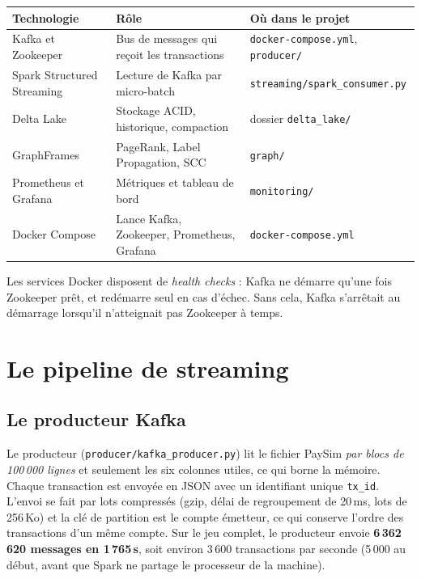 \documentclass[11pt,a4paper]{article}
\begin{document}
\begin{center}
\small
\begin{tabular}{@{}p{3.2cm}p{5.4cm}p{5.2cm}@{}}
\toprule
\textbf{Technologie} & \textbf{R\^ole} & \textbf{O\`u dans le projet} \\
\midrule
Kafka et Zookeeper & Bus de messages qui re\c{c}oit les transactions & \texttt{docker-compose.yml}, \texttt{producer/} \\
Spark Structured Streaming & Lecture de Kafka par micro-batch & \texttt{streaming/spark\_consumer.py} \\
Delta Lake & Stockage ACID, historique, compaction & dossier \texttt{delta\_lake/} \\
GraphFrames & PageRank, Label Propagation, SCC & \texttt{graph/} \\
Prometheus et Grafana & M\'etriques et tableau de bord & \texttt{monitoring/} \\
Docker Compose & Lance Kafka, Zookeeper, Prometheus, Grafana & \texttt{docker-compose.yml} \\
\bottomrule
\end{tabular}
\end{center}

Les services Docker disposent de \emph{health checks} : Kafka ne d\'emarre qu'une fois Zookeeper pr\^et, et red\'emarre seul en cas d'\'echec. Sans cela, Kafka s'arr\^etait au d\'emarrage lorsqu'il n'atteignait pas Zookeeper \`a temps.

\section{Le pipeline de streaming}
\subsection{Le producteur Kafka}
Le producteur (\texttt{producer/kafka\_producer.py}) lit le fichier PaySim \emph{par blocs de 100\,000 lignes} et seulement les six colonnes utiles, ce qui borne la m\'emoire. Chaque transaction est envoy\'ee en JSON avec un identifiant unique \texttt{tx\_id}. L'envoi se fait par lots compress\'es (gzip, d\'elai de regroupement de 20\,ms, lots de 256\,Ko) et la cl\'e de partition est le compte \'emetteur, ce qui conserve l'ordre des transactions d'un m\^eme compte. Sur le jeu complet, le producteur envoie \textbf{6\,362\,620 messages en 1\,765\,s}, soit environ 3\,600 transactions par seconde (5\,000 au d\'ebut, avant que Spark ne partage le processeur de la machine).
\end{document}
